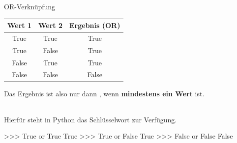          \begin{frame}[fragile]{OR-Verknüpfung}
            \begin{table}[]
            \centering
                \begin{tabular}{|c|c|c|}
                    \hline
                    \rowcolor[HTML]{EFEFEF} 
                    Wert 1 & Wert 2 & Ergebnis (OR) \\ \hline
                    True   & True   & True           \\ \hline
                    True   & False  & True          \\ \hline
                    False  & True   & True          \\ \hline
                    False  & False  & False          \\ \hline
                \end{tabular}%
            \end{table}
            
           Das Ergebnis ist also nur dann , wenn \textbf{mindestens ein Wert }  ist.\\~\
            
            Hierfür steht in Python das Schlüsselwort  zur Verfügung.
            
\begin{pyconcode}
>>> True or True
True
>>> True or False
True
>>> False or False
False
\end{pyconcode}     

        \end{frame}
        
